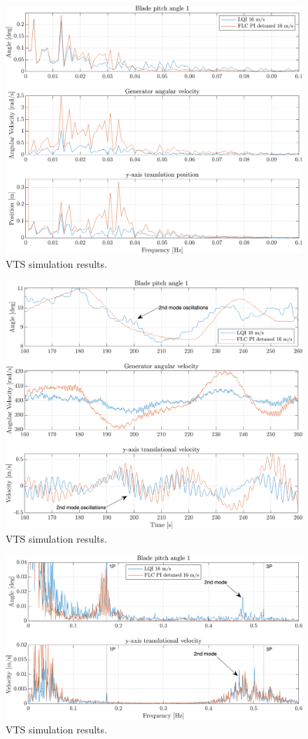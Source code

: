 \begin{figure}[ht]
	\centering
	\includegraphics[width=0.7\linewidth]{Graphics/TestResults/VTSplotting/11_fft_th_w_py_vy.png}
	\caption{VTS simulation results.}
	\label{fig:vts_11_fft_th_w_py_vy}
\end{figure}

\begin{figure}[ht]
	\centering
	\includegraphics[width=0.7\linewidth]{Graphics/TestResults/VTSplotting/12_zoom_th_w_py_vy.png}
	\caption{VTS simulation results.}
	\label{fig:vts_12_zoom_th_w_py_vy}
\end{figure}

\begin{figure}[ht]
	\centering
	\includegraphics[width=0.7\linewidth]{Graphics/TestResults/VTSplotting/13_zoom_fft_th_w_py_vy.png}
	\caption{VTS simulation results.}
	\label{fig:vts_13_zoom_fft_th_w_py_vy}
\end{figure}

